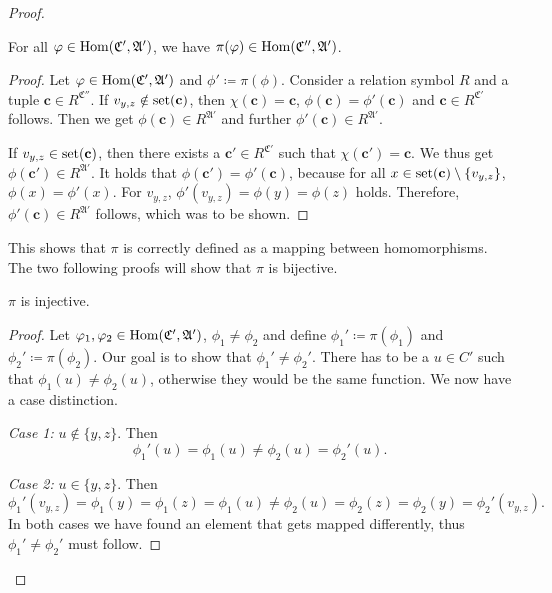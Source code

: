\begin{proof}
	\begin{claim}
		For all $\varphi\in \operatorname{Hom}(\mathfrak C',\mathfrak A')$, we have $\pi(\varphi)\in\operatorname{Hom}(\mathfrak C'',\mathfrak A')$.
	\end{claim}
	\begin{proof}
		Let $\varphi\in\operatorname{Hom}(\mathfrak C',\mathfrak A')$ and $\phi'\coloneqq \pi(\phi)$.
		Consider a relation symbol $R$ and a tuple $\mathbf c \in R^{\mathfrak C''}$.
		If $v_{y,z}\notin\operatorname{set}(\mathbf c)$, then $\chi(\mathbf c)=\mathbf c$, $\phi(\mathbf c)=\phi'(\mathbf c)$ and $\mathbf c\in R^{\mathfrak C'}$ follows.
		Then we get $\phi(\mathbf c)\in R^{\mathfrak A'}$ and further $\phi'(\mathbf c)\in R^{\mathfrak A'}$.
		
		If $v_{y,z}\in\operatorname{set}(\mathbf c)$, then there exists a $\mathbf c'\in R^{\mathfrak C'}$ such that $\chi(\mathbf c')=\mathbf c$. 
		We thus get $\phi(\mathbf c')\in R^{\mathfrak A'}$.
		It holds that $\phi(\mathbf c')=\phi'(\mathbf c)$, because for all $x \in \operatorname{set}(\mathbf c)\setminus \{v_{y,z}\}$, $\phi(x)=\phi'(x)$.
		For $v_{y,z}$, $\phi'(v_{y,z})=\phi(y)=\phi(z)$ holds.
		Therefore, $\phi'(\mathbf c)\in R^{\mathfrak A'}$ follows, which was to be shown.
	\end{proof}
	
	This shows that $\pi$ is correctly defined as a mapping between homomorphisms.
	The two following proofs will show that $\pi$ is bijective.
	
	\begin{claim}
		$\pi$ is injective.
	\end{claim}
	\begin{proof}
		Let $\varphi_1,\varphi_2\in\operatorname{Hom}(\mathfrak C',\mathfrak A')$, $\phi_1\neq\phi_2$ and define $\phi_1'\coloneqq \pi(\phi_1)$ and $\phi_2'\coloneqq \pi(\phi_2)$.
		Our goal is to show that $\phi_1'\neq \phi_2'$.
		There has to be a $u\in C'$ such that $\phi_1(u)\neq\phi_2(u)$, otherwise they would be the same function.
		We now have a case distinction.
		
		\emph{Case 1:} $u\notin\{y,z\}$. Then
		$$\phi_1'(u)=\phi_1(u)\neq \phi_2(u)=\phi_2'(u).$$
		
		\emph{Case 2:} $u\in \{y,z\}$. Then
		$$\phi_1'(v_{y,z})=\phi_1(y)=\phi_1(z)=\phi_1(u)\neq \phi_2(u)=\phi_2(z)=\phi_2(y)=\phi_2'(v_{y,z}).$$
		In both cases we have found an element that gets mapped differently, thus $\phi_1'\neq\phi_2'$ must follow.
	\end{proof}
	

\end{proof}
